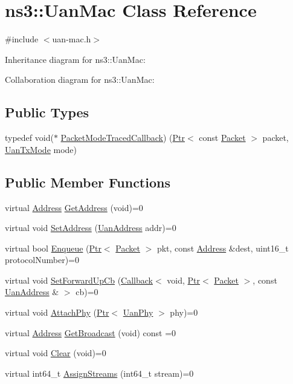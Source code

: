 \hypertarget{classns3_1_1UanMac}{}\section{ns3\+:\+:Uan\+Mac Class Reference}
\label{classns3_1_1UanMac}


{\ttfamily \#include $<$uan-\/mac.\+h$>$}



Inheritance diagram for ns3\+:\+:Uan\+Mac\+:


Collaboration diagram for ns3\+:\+:Uan\+Mac\+:
\subsection*{Public Types}
\begin{DoxyCompactItemize}
\item 
typedef void($\ast$ \hyperlink{classns3_1_1UanMac_ac00ed8b0d58c5e105c24d3b38d50e375}{Packet\+Mode\+Traced\+Callback}) (\hyperlink{classns3_1_1Ptr}{Ptr}$<$ const \hyperlink{classns3_1_1Packet}{Packet} $>$ packet, \hyperlink{classns3_1_1UanTxMode}{Uan\+Tx\+Mode} mode)
\end{DoxyCompactItemize}
\subsection*{Public Member Functions}
\begin{DoxyCompactItemize}
\item 
virtual \hyperlink{classns3_1_1Address}{Address} \hyperlink{classns3_1_1UanMac_acb7d2a67ab233b5750f3b2bf2b64440e}{Get\+Address} (void)=0
\item 
virtual void \hyperlink{classns3_1_1UanMac_a52db4af3406b199660cb222784b817f9}{Set\+Address} (\hyperlink{classns3_1_1UanAddress}{Uan\+Address} addr)=0
\item 
virtual bool \hyperlink{classns3_1_1UanMac_a4d9259b3d0592ac5c1657216789ea2bc}{Enqueue} (\hyperlink{classns3_1_1Ptr}{Ptr}$<$ \hyperlink{classns3_1_1Packet}{Packet} $>$ pkt, const \hyperlink{classns3_1_1Address}{Address} \&dest, uint16\+\_\+t protocol\+Number)=0
\item 
virtual void \hyperlink{classns3_1_1UanMac_af8378ecc8b3246aa10f9da5da30da973}{Set\+Forward\+Up\+Cb} (\hyperlink{classns3_1_1Callback}{Callback}$<$ void, \hyperlink{classns3_1_1Ptr}{Ptr}$<$ \hyperlink{classns3_1_1Packet}{Packet} $>$, const \hyperlink{classns3_1_1UanAddress}{Uan\+Address} \& $>$ cb)=0
\item 
virtual void \hyperlink{classns3_1_1UanMac_a8c47721cbe5fabab867aca200618ba7c}{Attach\+Phy} (\hyperlink{classns3_1_1Ptr}{Ptr}$<$ \hyperlink{classns3_1_1UanPhy}{Uan\+Phy} $>$ phy)=0
\item 
virtual \hyperlink{classns3_1_1Address}{Address} \hyperlink{classns3_1_1UanMac_a16a70508cae032144a44e7534c8636b1}{Get\+Broadcast} (void) const =0
\item 
virtual void \hyperlink{classns3_1_1UanMac_a82fb3d02bc2fe1f0eed7ad3b816af7bd}{Clear} (void)=0
\item 
virtual int64\+\_\+t \hyperlink{classns3_1_1UanMac_a903c2313ccb53edb49fb7b97c1417684}{Assign\+Streams} (int64\+\_\+t stream)=0
\end{DoxyCompactItemize}
